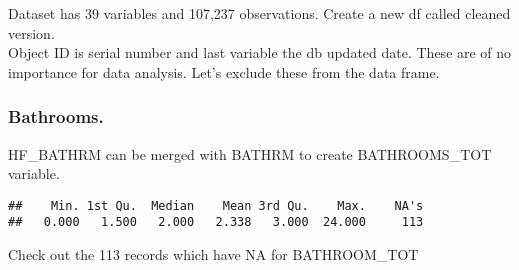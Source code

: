 \documentclass[]{article}
\newenvironment{Shaded}{\begin{snugshade}}{\end{snugshade}}
\newcommand{\DataTypeTok}[1]{\textcolor[rgb]{0.13,0.29,0.53}{#1}}
\newcommand{\FloatTok}[1]{\textcolor[rgb]{0.00,0.00,0.81}{#1}}
\newcommand{\KeywordTok}[1]{\textcolor[rgb]{0.13,0.29,0.53}{\textbf{#1}}}
\newcommand{\NormalTok}[1]{#1}
\newcommand{\OperatorTok}[1]{\textcolor[rgb]{0.81,0.36,0.00}{\textbf{#1}}}
\newcommand{\StringTok}[1]{\textcolor[rgb]{0.31,0.60,0.02}{#1}}
\begin{document}
Dataset has 39 variables and 107,237 observations. Create a new df
called cleaned version.\\
Object ID is serial number and last variable the db updated date. These
are of no importance for data analysis. Let's exclude these from the
data frame.

\begin{Shaded}
\end{Shaded}

\hypertarget{bathrooms.}{%
\subsubsection{Bathrooms.}\label{bathrooms.}}

HF\_BATHRM can be merged with BATHRM to create BATHROOMS\_TOT variable.

\begin{Shaded}
\end{Shaded}

\begin{verbatim}
##    Min. 1st Qu.  Median    Mean 3rd Qu.    Max.    NA's 
##   0.000   1.500   2.000   2.338   3.000  24.000     113
\end{verbatim}

Check out the 113 records which have NA for BATHROOM\_TOT

\begin{Shaded}
\end{Shaded}
\end{document}

